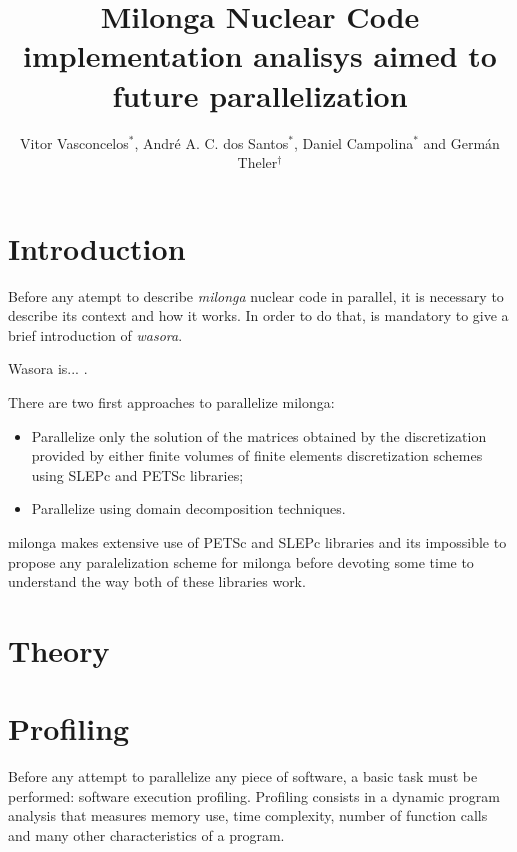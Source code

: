 \documentclass{anstrans}
\title{Milonga Nuclear Code implementation analisys aimed to future parallelization}
\author{Vitor Vasconcelos$^{*}$, Andr\'e A. C. dos Santos$^{*}$, Daniel Campolina$^{*}$ and Germ\'an Theler$^{\dagger}$}
\institute{
$^{*}$Centro de Desenvolvimento da Tecnologia Nuclear, CEP 31270-901,
Belo Horizonte - MG, Brazil
\and
$^{\dagger}$Seamples, Rafaela, Argentina
}
\begin{document}
\vspace*{-42pt}
\begin{strip}
\vspace*{14pt}
\end{strip}


\section{Introduction}

Before any atempt to describe \textit{milonga} nuclear code in parallel, it is
necessary to describe its context and how it works. In order to do that, is mandatory
to give a brief introduction of \textit{wasora}.

Wasora is... \cite{wasora}.

There are two first approaches to parallelize milonga:
\begin{itemize}
\item Parallelize only the solution of the matrices obtained by the discretization
  provided by either finite volumes of finite elements discretization schemes using
  SLEPc and PETSc libraries;
\item Parallelize using domain decomposition techniques.
\end{itemize}

milonga makes extensive use of PETSc \cite{petsc} and SLEPc \cite{Hernandez2005} libraries and
its impossible to propose any paralelization scheme for milonga before devoting some
time to understand the way both of these libraries work.

\section{Theory}

\section{Profiling}
Before any attempt to parallelize any piece of software, a basic task must be performed:
software execution profiling. Profiling consists in a dynamic program analysis
that measures memory use, time complexity, number of function calls and many other characteristics of
a program.
\end{document}
